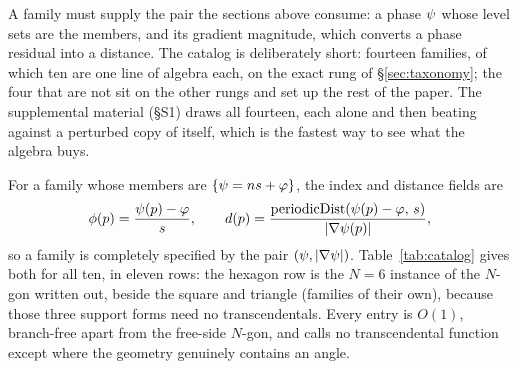 A family must supply the pair the sections above consume: a phase $\psi$ whose
level sets are the members, and its gradient magnitude, which converts a phase
residual into a distance. The catalog is deliberately short: fourteen
families, of which ten are one line of algebra each, on the exact rung of
\S\ref{sec:taxonomy}; the four that are not sit on the other rungs and set up
the rest of the paper. The supplemental material (\S S1) draws all fourteen,
each alone and then beating against a perturbed copy of itself, which is the
fastest way to see what the algebra buys.

For a family whose members are $\{\psi=ns+\varphi\}$, the index and distance
fields are
\begin{equation}
  \phi(p)=\frac{\psi(p)-\varphi}{s},
  \qquad
  d(p)=\frac{\mathrm{periodicDist}\!\left(\psi(p)-\varphi,\,s\right)}{\lvert\nabla\psi(p)\rvert},
  \label{eq:closedpair}
\end{equation}
so a family is completely specified by the pair $(\psi,\lvert\nabla\psi\rvert)$.
Table~\ref{tab:catalog} gives both for all ten, in eleven rows: the hexagon row
is the $N{=}6$ instance of the $N$-gon written out, beside the square and
triangle (families of their own), because those three support forms need no
transcendentals. Every entry is $O(1)$, branch-free
apart from the free-side $N$-gon, and calls no transcendental function except where
the geometry genuinely contains an angle.

